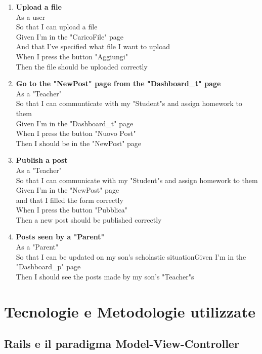 \documentclass[Lau, binding=0.6cm, oneside]{sapthesis}
\begin{document}
\begin{enumerate}
	\item \textbf{Upload a file}\\
			As a user\\
			So that I can upload a file\\
			Given I’m in the "CaricoFile" page\\
			And that I’ve specified what file I want to upload\\
			When I press the button "Aggiungi"\\
			Then the file should be uploaded correctly\\
	\item \textbf{Go to the "NewPost" page from the "Dashboard\_t" page}\\
			As a "Teacher"\\
			So that I can communticate with my "Student"s and assign homework to them\\
			Given I’m in the "Dashboard\_t" page\\
			When I press the button "Nuovo Post"\\
			Then I should be in the "NewPost" page\\
	\item \textbf{Publish a post}\\
			As a "Teacher"\\
			So that I can communicate with my "Student"s and assign homework to them\\
			Given I’m in the "NewPost" page\\
			and that I filled the form correctly\\
			When I press the button "Pubblica"\\
			Then a new post should be published correctly\\
	\item \textbf{Posts seen by a "Parent"}\\
			As a "Parent"\\
			So that I can be updated on my son’s scholastic situationGiven I’m in the "Dashboard\_p" page\\
			Then I should see the posts made by my son’s "Teacher"s\\
\end{enumerate}

\chapter{Tecnologie e Metodologie utilizzate}

\section{Rails e il paradigma Model-View-Controller} \label{mvc}
\end{document}
